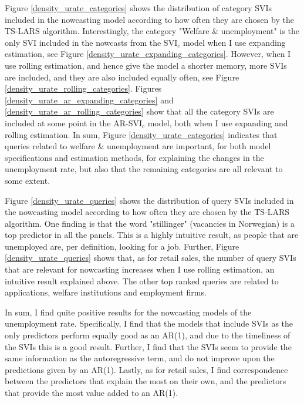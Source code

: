 Figure \ref{density_urate_categories} shows the distribution of category SVIs included in the nowcasting model according to how often they are chosen by the TS-LARS algorithm. Interestingly, the category "Welfare \& unemployment" is the only SVI included in the nowcasts from the SVI$_c$ model when I use expanding estimation, see Figure \ref{density_urate_expanding_categories}. However, when I use rolling estimation, and hence give the model a shorter memory, more SVIs are included, and they are also included equally often, see Figure \ref{density_urate_rolling_categories}. Figures \ref{density_urate_ar_expanding_categories} and \ref{density_urate_ar_rolling_categories} show that all the category SVIs are included at some point in the AR-SVI$_c$ model, both when I use expanding and rolling estimation. In sum, Figure \ref{density_urate_categories} indicates that queries related to welfare \& unemployment are important, for both model specifications and estimation methods, for explaining the changes in the unemployment rate, but also that the remaining categories are all relevant to some extent.

Figure \ref{density_urate_queries} shows the distribution of query SVIs included in the nowcasting model according to how often they are chosen by the TS-LARS algorithm. One finding is that the word "stillinger" (vacancies in Norwegian) is a top predictor in all the panels. This is a highly intuitive result, as people that are unemployed are, per definition, looking for a job. Further, Figure \ref{density_urate_queries} shows that, as for retail sales, the number of query SVIs that are relevant for nowcasting increases when I use rolling estimation, an intuitive result explained above. The other top ranked queries are related to applications, welfare institutions and employment firms.

In sum, I find quite positive results for the nowcasting models of the unemployment rate. Specifically, I find that the models that include SVIs as the only predictors perform equally good as an AR(1), and due to the timeliness of the SVIs this is a good result. Further, I find that the SVIs seem to provide the same information as the autoregressive term, and do not improve upon the predictions given by an AR(1). Lastly, as for retail sales, I find correspondence between the predictors that explain the most on their own, and the predictors that provide the most value added to an AR(1). \clearpage

